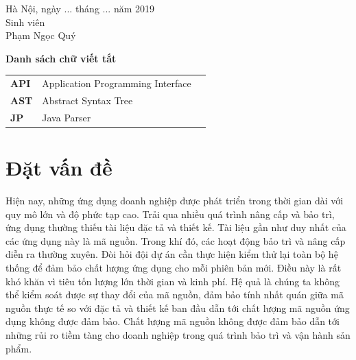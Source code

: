 \documentclass[12pt]{report}
\begin{document}
\begin{flushright}
	\begin{varwidth}{\linewidth}\centering
		Hà Nội, ngày ... tháng ... năm 2019\\
		Sinh viên\\[2cm]
		Phạm Ngọc Quý
	\end{varwidth}
\end{flushright}

\newpage
\tableofcontents

\newpage
{}
\listoftables

\newpage
{}
\begin{flushleft}
\bfseries{\Huge{Danh sách chữ viết tắt}}
\end{flushleft}
\begin{table}[h]
	\centering
	\begin{tabular}{lll}
	\textbf{API}  & Application Programming Interface\\[0.3cm]
	\textbf{AST}  & Abstract Syntax Tree\\[0.3cm]
	\textbf{JP}  &  Java Parser \\[0.3cm]
	\end{tabular}
\end{table}

\newpage
{}
\listoffigures

\newpage
{}
\setcounter{page}{1}
\chapter{Đặt vấn đề}
\label{chap:intro}
Hiện nay, những ứng dụng doanh nghiệp được phát triển trong thời gian dài với quy mô lớn và độ phức tạp cao. Trải qua nhiều quá trình nâng cấp và bảo trì, ứng dụng thường thiếu tài liệu đặc tả và thiết kế. Tài liệu gần như duy nhất của các ứng dụng này là mã nguồn.
Trong khí đó, các hoạt động bảo trì và nâng cấp diễn ra thường xuyên. Đòi hỏi đội dự án cần thực hiện kiểm thử lại toàn bộ hệ thống để đảm bảo chất lượng ứng dụng cho mỗi phiên bản mới. Điều này là rất khó khăn vì tiêu tốn lượng lớn thời gian và kinh phí. Hệ quả là chúng ta không thể kiểm soát được sự thay đổi của mã nguồn, đảm bảo tính nhất quán giữa mã nguồn thực tế so với đặc tả và thiết kế ban đầu dẫn tới chất lượng mã nguồn ứng dụng không được đảm bảo. Chất lượng mã nguồn không được đảm bảo dẫn tới những rủi ro tiềm tàng cho doanh nghiệp trong quá trình bảo trì và vận hành sản phẩm.
\end{document}
